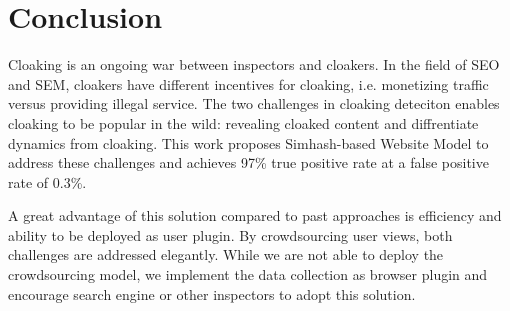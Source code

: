 \section{Conclusion}
\label{s:conclusion}

Cloaking is an ongoing war between inspectors and cloakers. 
In the field of SEO and SEM, cloakers have different incentives for cloaking,
i.e. monetizing traffic versus providing illegal service.
The two challenges in cloaking deteciton enables cloaking to be popular in the
wild: revealing cloaked content and diffrentiate dynamics from cloaking.
This work proposes Simhash-based Website Model to address these challenges and
achieves 97\% true positive rate at a false positive rate of 0.3\%.  

A great advantage of this
solution compared to past approaches is efficiency and ability to be deployed as
user plugin. By crowdsourcing user views, both challenges are addressed
elegantly. While we are not able to deploy
the crowdsourcing model, we implement the data collection as browser plugin and
encourage search engine or other inspectors to adopt this solution.




%
%


